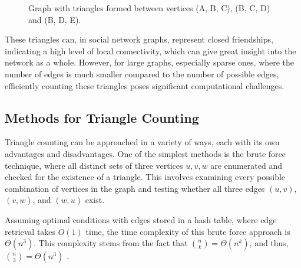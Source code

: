 \documentclass[12pt]{article}
\begin{document}
\begin{figure}[H]
    \centering
    \begin{minipage}{0.45\textwidth}
        \caption{Graph with triangles formed between vertices (A, B, C), (B, C, D) and (B, D, E).}
        \label{fig:triangles}
    \end{minipage}%
\end{figure}

These triangles can, in social network graphs, represent closed friendships, indicating a high level of local connectivity, which can give great insight into the network as a whole.
However, for large graphs, especially sparse ones, where the number of edges is much smaller compared to the number of possible edges, efficiently counting these triangles poses significant computational challenges.

\subsection{Methods for Triangle Counting}

Triangle counting can be approached in a variety of ways, each with its own advantages and disadvantages. 
One of the simplest methods is the brute force technique, where all distinct sets of three vertices ${u, v, w}$ are enumerated and checked for the existence of a triangle.
This involves examining every possible combination of vertices in the graph and testing whether all three edges $(u, v)$, $(v, w)$, and $(w, u)$ exist. 

Assuming optimal conditions with edges stored in a hash table, where edge retrieval takes $O(1)$ time, the time complexity of this brute force approach is $\Theta(n^3)$. 
This complexity stems from the fact that ${n \choose k} = \Theta(n^k)$, and thus, ${n \choose 3} = \Theta(n^3)$ \cite{al_hasan_triangle_2018}. 
\end{document}

